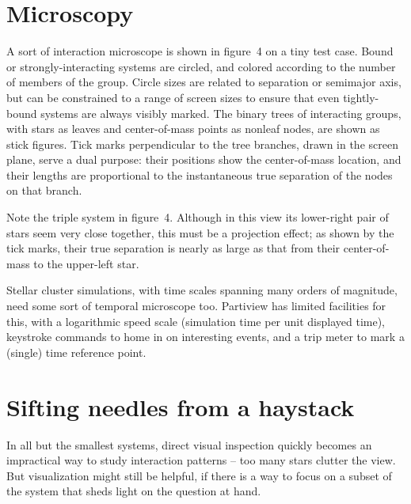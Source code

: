 \section{Microscopy}
A sort of interaction microscope is shown in figure~4 on a tiny test case.
Bound or strongly-interacting systems are circled, and colored according to the
number of members of the group.  Circle sizes are related
to separation or semimajor axis, but can be constrained to a range
of screen sizes to ensure that even tightly-bound systems are always
visibly marked.   The binary trees of interacting groups,
with stars as leaves and center-of-mass points as nonleaf nodes,
are shown as stick figures.
Tick marks perpendicular to the tree branches, drawn in the screen plane,
serve a dual purpose: their positions show the center-of-mass location,
and their lengths are proportional to the instantaneous true separation
of the nodes on that branch.

Note the triple system in figure~4.  Although in this view its
lower-right pair of stars seem very close together, this must be a 
projection effect; as shown by the tick marks, their true separation
is nearly as large as that from their center-of-mass to the upper-left star.


Stellar cluster simulations, with time scales spanning many orders
of magnitude, need some sort of temporal microscope too.  Partiview has
limited facilities for this, with a logarithmic speed scale
(simulation time per unit displayed time), keystroke commands to
home in on interesting events, and a trip meter to mark a (single)
time reference point.  


\section{Sifting needles from a haystack}
In all but the smallest systems, direct visual inspection quickly becomes
an impractical way to study interaction patterns -- too many stars
clutter the view.  But visualization might still be helpful, if there is a way
to focus on a subset of the system that sheds light on the question at hand.

